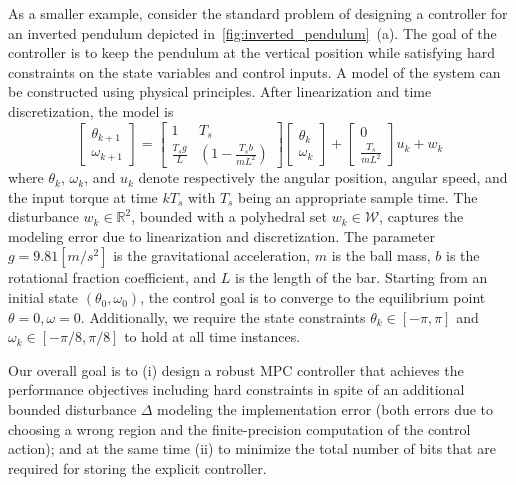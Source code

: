 As a smaller example, consider the standard problem of designing a controller for an inverted pendulum depicted in~\autoref{fig:inverted_pendulum}~{(a)}.
The goal of the controller is to keep the pendulum at the vertical position while satisfying hard constraints on the state variables and control inputs.
A model of the system can be constructed using physical principles. 
After linearization and time discretization, the model is
	\begin{equation}
		\begin{bmatrix}
			 \theta_{k+1}\\
			\omega_{k+1}
		\end{bmatrix}=
		\begin{bmatrix}
			1 & T_s\\
			\frac{T_sg}{L}& (1-\frac{T_sb}{mL^2})		
		\end{bmatrix}
		\begin{bmatrix}
			\theta_k\\
			\omega_k
		\end{bmatrix}+
		\begin{bmatrix}
			0\\
			\frac{T_s}{mL^2}
		\end{bmatrix}u_k + w_k
		\label{eq:pendul_ss}
	\end{equation}
where $\theta_k$, $\omega_k$, and $u_k$ denote respectively the angular position, angular speed, 
and the input torque at time $kT_s$ with $T_s$ being an appropriate sample time.
The disturbance $w_k\in\mathbb R^2$, bounded with a polyhedral set $w_k\in \mathcal W$, captures the modeling error due to 
linearization and discretization. 
The parameter $g=9.81 [m/s^2]$ is the gravitational acceleration, $m$ is the ball mass, $b$ is the rotational fraction coefficient, 
and $L$ is the length of the bar. 
Starting from an initial state $(\theta_0,\omega_0)$, the control goal is to converge to the equilibrium point 
$\theta=0, \omega=0$.
Additionally, we require the state constraints $\theta_k\in[-\pi,\pi]$ and $\omega_k\in[-\pi/8,\pi/8]$ to hold at all time instances.

Our overall goal is to 
(i) design a robust MPC controller that achieves the performance objectives including hard constraints in spite of an additional bounded
disturbance $\Delta$ modeling the implementation error (both errors due to choosing a wrong region and the finite-precision computation of the control action);
and at the same time
(ii) to minimize the total number of bits that are required for storing the explicit controller.

